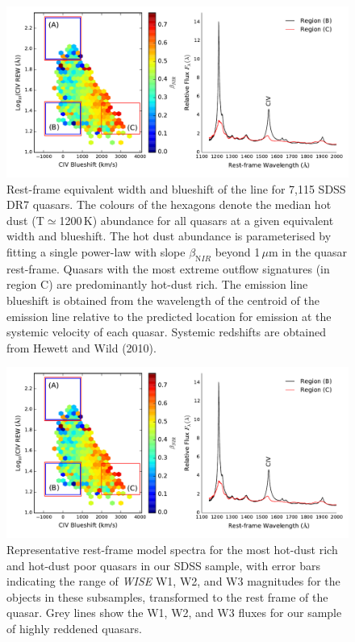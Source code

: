 \begin{figure}
\centering
  \includegraphics[width=\columnwidth]{figures/chapter06/ntt_proposal_figure1.pdf}
\caption{Rest-frame equivalent width and blueshift of the
 line for 7,115 SDSS DR7 quasars. The colours of the hexagons
denote the median hot dust (T$\simeq$1200\,K) abundance for all
quasars at a given equivalent width and blueshift. The hot dust
abundance is parameterised by fitting a single power-law with slope
$\beta_{\mathrm NIR}$ beyond 1\,$\mu$m in the quasar rest-frame. Quasars
with the most extreme outflow signatures (in region C) are predominantly
hot-dust rich. The  emission line blueshift is obtained from
the wavelength of the centroid of the emission line relative to the
predicted location for emission at the systemic velocity of each
quasar. Systemic redshifts are obtained from Hewett and Wild (2010).}
  \label{fig:}
\end{figure}

\begin{figure}
\centering
  \includegraphics[width=\columnwidth]{figures/chapter06/ntt_proposal_figure1.pdf}
\caption{Representative rest-frame model spectra for the
most hot-dust rich and hot-dust poor quasars in our SDSS sample, with
error bars indicating the range of {\it WISE} W1, W2, and W3
magnitudes for the objects in these subsamples, transformed to the
rest frame of the quasar. Grey lines show the W1, W2, and W3 fluxes
for our sample of highly reddened quasars.}
  \label{fig:}
\end{figure}

